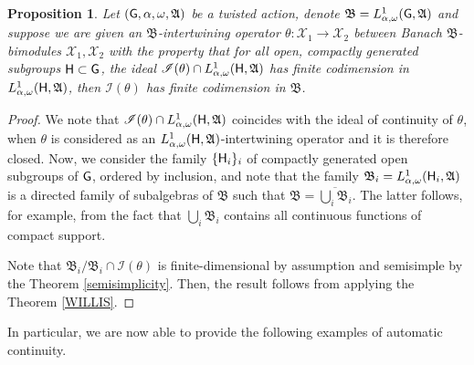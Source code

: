 \documentclass[11pt]{article}
\newcommand{\A}{\mathfrak{A}}
\newcommand{\B}{\mathfrak{B}}
\def\X{\mathcal{X}}
\def\G{{\sf G}}
\def\H{{\sf H}}
\newtheorem{prop}[thm]{Proposition}
\theoremstyle{definition}
\theoremstyle{remark}
\numberwithin{equation}{section}
\numberwithin{equation}{section}
\begin{document}
\begin{prop}\label{lifing}
    Let $(\G,\alpha,\omega,\A)$ be a twisted action, denote $\B=L^1_{\alpha,\omega}(\G,\A)$ and suppose we are given an $\B$-intertwining operator $\theta:\X_1\to\X_2$ between Banach $\B$-bimodules $\X_1,\X_2$ with the property that for all open, compactly generated subgroups $\H\subset \G$, the ideal $\mathscr I(\theta)\cap L^1_{\alpha,\omega}(\H,\A)$ has finite codimension in $L^1_{\alpha,\omega}(\H,\A)$, then $\mathscr I(\theta)$ has finite codimension in $\B$.
\end{prop}
\begin{proof}
    We note that $\mathscr I(\theta)\cap L^1_{\alpha,\omega}(\H,\A)$ coincides with the ideal of continuity of $\theta$, when $\theta$ is considered as an $L^1_{\alpha,\omega}(\H,\A)$-intertwining operator and it is therefore closed. Now, we consider the family $\{\H_i\}_i$ of compactly generated open subgroups of $\G$, ordered by inclusion, and note that the family $\B_i=L^1_{\alpha,\omega}(\H_i,\A)$ is a directed family of subalgebras of $\B$ such that $\B=\overline{\bigcup_i \B_i}$. The latter follows, for example, from the fact that $\bigcup_i \B_i$ contains all continuous functions of compact support.

Note that $\B_i/\B_i\cap \mathscr I(\theta)$ is finite-dimensional by assumption and semisimple by the Theorem \ref{semisimplicity}. Then, the result follows from applying the Theorem \ref{WILLIS}.
\end{proof}

In particular, we are now able to provide the following examples of automatic continuity.
\end{document}
